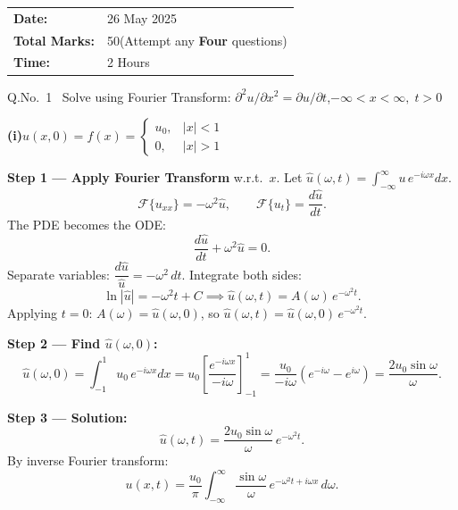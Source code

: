 \documentclass[12pt]{article}
\newcommand{\Ft}{\mathcal{F}}
\begin{document}
\vspace{16pt}
\begin{tcolorbox}[colback=lightbg,colframe=accent,arc=4pt,boxrule=1pt,
  left=12pt,right=12pt,top=10pt,bottom=10pt]
\begin{tabular}{ll}
  \textcolor{accent}{\bfseries Date:}&26 May 2025\\
  \textcolor{accent}{\bfseries Total Marks:}&50\quad(Attempt any \textbf{Four} questions)\\
  \textcolor{accent}{\bfseries Time:}&2 Hours\\
\end{tabular}
\end{tcolorbox}

\newpage

\begin{qbox}{Q.No.\ 1 \textemdash\ Solve using Fourier Transform: $\partial^2 u/\partial x^2 = \partial u/\partial t$,\quad $-\infty<x<\infty,\;t>0$}
\end{qbox}

\medskip
\textbf{(i)}\quad $u(x,0)=f(x)=\begin{cases}u_0,&|x|<1\\0,&|x|>1\end{cases}$

\begin{ansbox}
\textbf{Step 1 — Apply Fourier Transform} w.r.t.\ $x$. Let $\hat{u}(\omega,t)=\int_{-\infty}^{\infty}u\,e^{-i\omega x}dx$.
\[
  \Ft\{u_{xx}\}=-\omega^2\hat{u},\qquad \Ft\{u_t\}=\frac{d\hat{u}}{dt}.
\]
The PDE becomes the ODE:
\[
  \frac{d\hat{u}}{dt}+\omega^2\hat{u}=0.
\]
Separate variables: $\dfrac{d\hat{u}}{\hat{u}}=-\omega^2\,dt$. Integrate both sides:
\[
  \ln|\hat{u}|=-\omega^2 t+C \implies \hat{u}(\omega,t)=A(\omega)\,e^{-\omega^2 t}.
\]
Applying $t=0$: $A(\omega)=\hat{u}(\omega,0)$, so $\hat{u}(\omega,t)=\hat{u}(\omega,0)\,e^{-\omega^2 t}$.

\textbf{Step 2 — Find $\hat{u}(\omega,0)$:}
\[
  \hat{u}(\omega,0)=\int_{-1}^{1}u_0\,e^{-i\omega x}dx
  =u_0\!\left[\frac{e^{-i\omega x}}{-i\omega}\right]_{-1}^{1}
  =\frac{u_0}{-i\omega}\left(e^{-i\omega}-e^{i\omega}\right)
  =\frac{2u_0\sin\omega}{\omega}.
\]

\textbf{Step 3 — Solution:}
\[
  \hat{u}(\omega,t)=\frac{2u_0\sin\omega}{\omega}\,e^{-\omega^2 t}.
\]
By inverse Fourier transform:
\[
  \boxed{u(x,t)=\frac{u_0}{\pi}\int_{-\infty}^{\infty}\frac{\sin\omega}{\omega}\,e^{-\omega^2 t+i\omega x}\,d\omega.}
\]
\end{ansbox}
\end{document}
